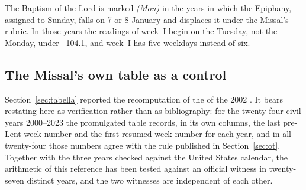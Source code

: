 The Baptism of the Lord is marked \emph{(Mon)} in the years in which the Epiphany, assigned to
Sunday, falls on 7 or 8 January and displaces it under the Missal's rubric. In those years the
readings of week~I begin on the Tuesday, not the Monday, under ~104.1, and week~I has five
weekdays instead of six.

\subsection{The Missal's own table as a control}

Section~\ref{sec:tabella} reported the recomputation of the  of the 2002
. It bears restating here as verification rather than as bibliography:
for the twenty-four civil years 2000--2023 the promulgated table records, in its own columns, the
last pre-Lent week number and the first resumed week number for each year, and in all twenty-four
those numbers agree with the rule published in Section~\ref{sec:ot}. Together with the three years
checked against the United States calendar, the arithmetic of this reference has been tested against
an official witness in twenty-seven distinct years, and the two witnesses are independent of each
other.
